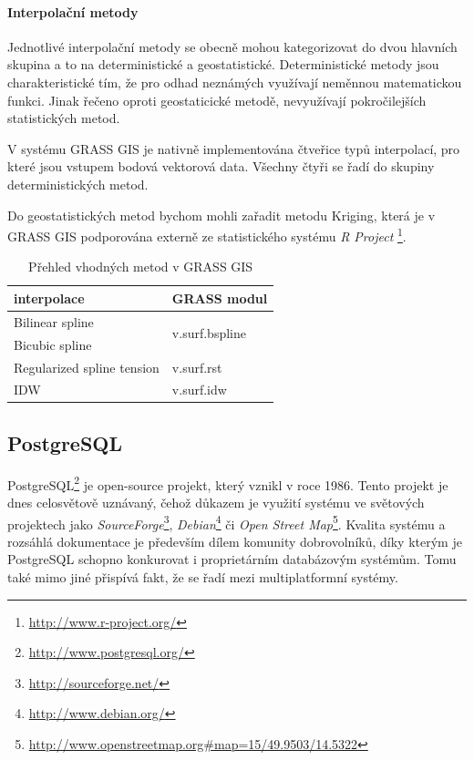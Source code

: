 \documentclass[a4paper,12pt,oneside]{report}
\begin{document}
\paragraph*{ Interpolační metody}
Jednotlivé interpolační metody se obecně mohou kategorizovat do dvou hlavních skupina a to na deterministické a geostatistické. 
Deterministické metody jsou charakteristické tím, že pro odhad neznámých využívají neměnnou matematickou funkci. Jinak řečeno oproti geostaticické metodě, nevyužívají pokročilejších statistických metod.

V systému GRASS GIS je nativně implementována čtveřice typů interpolací, pro které jsou vstupem  bodová vektorová data. Všechny čtyři se řadí do skupiny deterministických metod.

Do geostatistických metod bychom mohli zařadit metodu Kriging, která je v GRASS GIS podporována externě ze statistického systému \textit{R Project} \footnote{\url{http://www.r-project.org/}}.

\begin{table}[h]
\centering
\begin{tabular}{|ll|}
\hline
interpolace & GRASS modul \\ \hline\hline
Bilinear spline & \multirow{2}{*}{v.surf.bspline} \\
Bicubic spline &  \\
Regularized spline tension & v.surf.rst \\
IDW & v.surf.idw \\ \hline
\end{tabular}
\caption{Přehled vhodných metod v GRASS GIS}
\label{my-label}
\end{table}


\subsection{PostgreSQL}
PostgreSQL\footnote{\url{http://www.postgresql.org/}} je open-source projekt, který vznikl v roce 1986. Tento projekt je dnes celosvětově uznávaný, čehož důkazem je využití systému ve světových projektech jako \textit{SourceForge}\footnote{\url{http://sourceforge.net/}}, \textit{Debian}\footnote{\url{http://www.debian.org/}} či \textit{Open Street Map}\footnote{\url{http://www.openstreetmap.org\#map=15/49.9503/14.5322}}. Kvalita systému a rozsáhlá dokumentace je především dílem komunity dobrovolníků, díky kterým je PostgreSQL schopno konkurovat i proprietárním databázovým systémům. Tomu také mimo jiné přispívá fakt, že se řadí mezi multiplatformní systémy.\cite{postgre}
\end{document}

